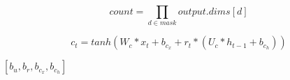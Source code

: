\documentclass{article}
\begin{document}
\[count = \prod\limits_{d \in mask} output.dims[d]\]
\pagebreak

\[ c_t = tanh(W_c*x_t + b_{c_x} + r_t*(U_c*h_{t-1}+b_{c_h})) \]
\pagebreak

$[b_{u}, b_{r}, b_{c_x}, b_{c_h}]$
\pagebreak
\end{document}
